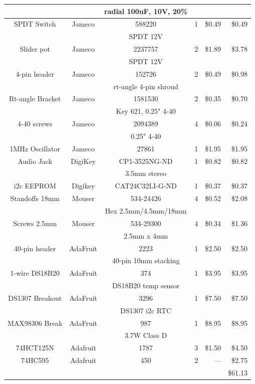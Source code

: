 \documentclass[11pt]{article}
\begin{document}
\begin{table}
\begin{tabular}{|c|c|c|c|r|r|}
		&		& radial 100uF, 10V, 20\% &     &          &         \\
\hline
SPDT Switch	& Jameco	& 588220		  & 1	&  \$0.49  &  \$0.49 \\
		&		& SPDT 12V		  &	&	   &	     \\
\hline
Slider pot	& Jameco	& 2237757		  & 2	&  \$1.89  &  \$3.78 \\
		&		& SPDT 12V		  &	&	   &	     \\
\hline
4-pin header	& Jameco	& 152726		  & 2	&  \$0.49  &  \$0.98 \\
		&		& rt-angle 4-pin shroud	  &	&          &         \\
\hline
Rt-angle Bracket& Jameco	& 1581530		  & 2	&  \$0.35  &  \$0.70 \\
		&		& Key 621, 0.25" 4-40	  &	&          &         \\
\hline
4-40 screws	& Jameco	& 2094389		  & 4	&  \$0.06  &  \$0.24 \\
		&		& 0.25" 4-40	  	  &	&          &         \\
\hline
1MHz Oscillator	& Jameco	& 27861			  & 1	& \$1.95   &  \$1.95 \\
\hline
Audio Jack	& DigiKey	& CP1-3525NG-ND	          & 1	&  \$0.82  &  \$0.82 \\
		&		& 3.5mm stereo		  &	&	   &	     \\
\hline
i2c EEPROM	& Digikey 	& CAT24C32LI-G-ND         & 1 	& \$0.37   &  \$0.37 \\
\hline
Standoffs 18mm	& Mouser	& 534-24426		  & 4   &  \$0.52  &  \$2.08 \\
		&		& Hex 2.5mm/4.5mm/18mm	  &	&	   &	     \\
\hline
Screws 2.5mm	& Mouser	& 534-29300		  & 4   &  \$0.34  &  \$1.36 \\
		&		& 2.5mm x 4mm             &	&	   &	     \\
\hline
40-pin header	& AdaFruit	& 2223                    & 1	&  \$2.50  &  \$2.50 \\
		&		& 40-pin 10mm stacking	  &     &          &         \\
\hline
1-wire DS18B20	& AdaFruit	& 374			  & 1	&  \$3.95  &  \$3.95 \\
		&		& DS18B20 temp sensor	  &	&	   &         \\
\hline
DS1307 Breakout	& AdaFruit	& 3296			  & 1	&  \$7.50  &  \$7.50 \\
		&		& DS1307 i2c RTC 	  &	&	   &         \\
\hline
MAX98306 Break	& AdaFruit	& 987		          & 1	&  \$8.95  &  \$8.95 \\
		&		& 3.7W Class D		  &	&	   &	\\
\hline
74HCT125N	& Adafruit	& 1787			  & 3	&  \$1.50  &  \$4.50 \\
\hline
74HC595		& Adafruit	& 450			  & 2	&  ---     &  \$2.75 \\
\hline
\hline
		&		&		&	&		& \$61.13 \\
\hline
\end{tabular}
\end{table}
\end{document}
